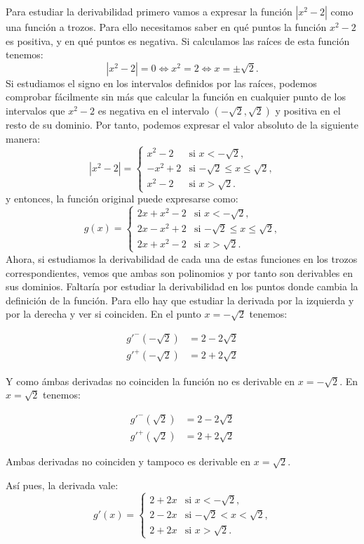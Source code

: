 {Para estudiar la derivabilidad primero vamos a expresar la función $|x^2-2|$ como una función a trozos. Para ello necesitamos saber en qué puntos la función $x^2-2$ es positiva, y en qué puntos es negativa. Si calculamos las raíces de esta función tenemos:
\[
|x^2-2| = 0 \Leftrightarrow x^2 = 2 \Leftrightarrow x = \pm \sqrt 2.
\]
Si estudiamos el signo en los intervalos definidos por las raíces, podemos comprobar fácilmente sin más que calcular la función en cualquier punto de los intervalos que $x^2-2$ es negativa en el intervalo $(-\sqrt 2, \sqrt 2)$ y positiva en el resto de su dominio.  
Por tanto, podemos expresar el valor absoluto de la siguiente manera:
\[
|x^2-2| = 
\begin{cases}
x^2-2 & \mbox{si $x< -\sqrt{2}$,} \\
-x^2+2 & \mbox{si $-\sqrt 2 \leq x \leq \sqrt 2$,}\\
x^2-2 & \mbox{si $x > \sqrt 2$.}
\end{cases}
\]
y entonces, la función original puede expresarse como:
\[
g(x) = 
\begin{cases}
2x+x^2-2 & \mbox{si $x< -\sqrt{2}$,} \\
2x-x^2+2 & \mbox{si $-\sqrt 2 \leq x \leq \sqrt 2$,}\\
2x+x^2-2 & \mbox{si $x > \sqrt 2$.}
\end{cases}
\]
Ahora, si estudiamos la derivabilidad de cada una de estas funciones en los trozos correspondientes, vemos que ambas son polinomios y por tanto son derivables en sus dominios. Faltaría por estudiar la derivabilidad en los puntos donde cambia la definición de la función. Para ello hay que estudiar la derivada por la izquierda y por la derecha y ver si coinciden. En el punto $x=-\sqrt 2$ tenemos:

\begin{align*}
g'^-(-\sqrt{2}) &= 2-2\sqrt 2\\
g'^+(-\sqrt{2}) &= 2+2\sqrt 2
\end{align*}

Y como ámbas derivadas no coinciden la función no es derivable en $x=-\sqrt 2$. En $x=\sqrt 2 $ tenemos:

\begin{align*}
g'^-(\sqrt{2}) &= 2-2\sqrt 2\\
g'^+(\sqrt{2}) &= 2+2\sqrt 2
\end{align*}

Ambas derivadas no coinciden y tampoco es derivable en $x=\sqrt 2$.

Así pues, la derivada vale:
\[
g'(x)=
\begin{cases}
2+2x & \mbox{si $x< -\sqrt{2}$,} \\
2-2x & \mbox{si $-\sqrt 2 < x < \sqrt 2$,}\\
2+2x & \mbox{si $x > \sqrt 2$.}
\end{cases}
\]
}


